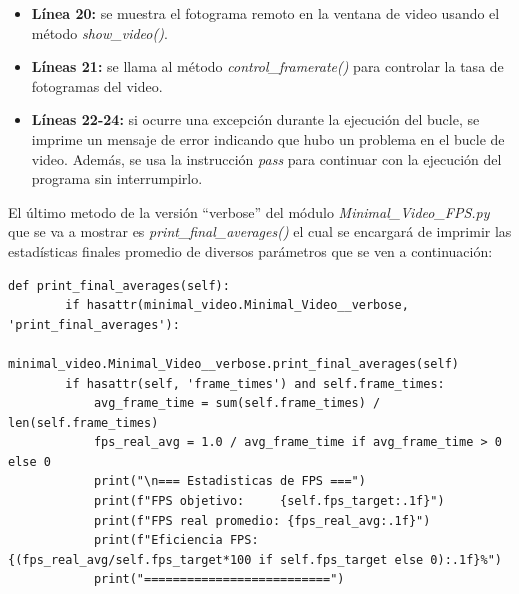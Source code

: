 \begin{itemize}
    \item \textbf{Línea 20:} se muestra el fotograma remoto en la ventana de video usando el método \textit{show\_video()}.
    \item \textbf{Líneas 21:} se llama al método \textit{control\_framerate()} para controlar la tasa de fotogramas del video.
    \item \textbf{Líneas 22-24:} si ocurre una excepción durante la ejecución del bucle, se imprime un mensaje de error indicando que hubo un problema en el bucle de video. Además, se usa la instrucción \textit{pass} para continuar con la ejecución del programa sin interrumpirlo.    
\end{itemize}
\vspace{\baselineskip}

El último metodo de la versión ``verbose'' del módulo \textit{Minimal\_Video\_FPS.py} que se va a mostrar es \textit{print\_final\_averages()} el cual se encargará de imprimir las estadísticas finales promedio de diversos parámetros que se ven a continuación:
\begin{lstlisting}[style=pythonstyle, caption={Método print\_final\_averages() de \textit{Minimal\_Video\_FPS\_verbose}}, label={lst:print_final_averages_minimal_video_fps_verbose}]
def print_final_averages(self):
        if hasattr(minimal_video.Minimal_Video__verbose, 'print_final_averages'):
            minimal_video.Minimal_Video__verbose.print_final_averages(self)
        if hasattr(self, 'frame_times') and self.frame_times:
            avg_frame_time = sum(self.frame_times) / len(self.frame_times)
            fps_real_avg = 1.0 / avg_frame_time if avg_frame_time > 0 else 0
            print("\n=== Estadisticas de FPS ===")
            print(f"FPS objetivo:     {self.fps_target:.1f}")
            print(f"FPS real promedio: {fps_real_avg:.1f}")
            print(f"Eficiencia FPS:    {(fps_real_avg/self.fps_target*100 if self.fps_target else 0):.1f}%")
            print("==========================")
\end{lstlisting}
\vspace{\baselineskip}

